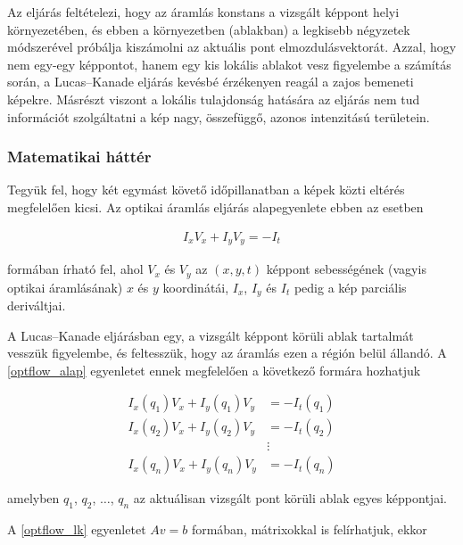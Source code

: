 Az eljárás feltételezi, hogy az áramlás konstans a vizsgált képpont helyi környezetében, és ebben a környezetben (ablakban) a legkisebb négyzetek módszerével próbálja kiszámolni az aktuális pont elmozdulásvektorát. Azzal, hogy nem egy-egy képpontot, hanem egy kis lokális ablakot vesz figyelembe a számítás során, a Lucas--Kanade eljárás kevésbé érzékenyen reagál a zajos bemeneti képekre. Másrészt viszont a lokális tulajdonság hatására az eljárás nem tud információt szolgáltatni a kép nagy, összefüggő, azonos intenzitású területein.

\subsubsection{Matematikai háttér}\label{sect:matrixok}

Tegyük fel, hogy két egymást követő időpillanatban a képek közti eltérés megfelelően kicsi. Az optikai áramlás eljárás alapegyenlete ebben az esetben

\begin{align}\label{eq:optflow_alap}
I_x V_x + I_y V_y = - I_t
\end{align}

formában írható fel, ahol $V_x$ és $V_y$ az $(x,y,t)$ képpont sebességének (vagyis optikai áramlásának) $x$ és $y$ koordinátái, $I_x$, $I_y$ és $I_t$ pedig a kép parciális deriváltjai.

A Lucas--Kanade eljárásban egy, a vizsgált képpont körüli ablak tartalmát vesszük figyelembe, és feltesszük, hogy az áramlás ezen a régión belül állandó. A \eqref{optflow_alap} egyenletet ennek megfelelően a következő formára hozhatjuk

\begin{align}\label{eq:optflow_lk}
I_x(q_1)V_x + I_y(q_1)V_y &= - I_t(q_1) \nonumber \\
I_x(q_2)V_x + I_y(q_2)V_y &= - I_t(q_2) \nonumber \\
&\vdots \nonumber \\
I_x(q_n)V_x + I_y(q_n)V_y &= - I_t(q_n)
\end{align}

amelyben $q_1$, $q_2$, $\ldots$, $q_n$ az aktuálisan vizsgált pont körüli ablak egyes képpontjai.

A \eqref{optflow_lk} egyenletet $Av = b$ formában, mátrixokkal is felírhatjuk, ekkor 

